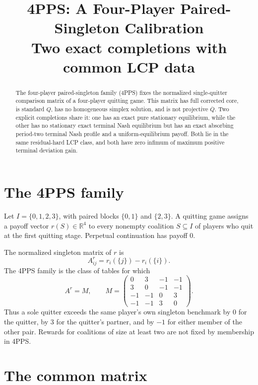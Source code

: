 \documentclass[11pt]{article}
\title{4PPS: A Four-Player Paired-Singleton Calibration\\
\large Two exact completions with common LCP data}
\author{}
\date{}
\theoremstyle{definition}
\newcommand{\R}{\mathbb R}
\begin{document}
\maketitle
\vspace{-1.5em}

\begin{abstract}
The four-player paired-singleton family (4PPS) fixes the normalized
single-quitter comparison matrix of a four-player quitting game.  This matrix
has full corrected core, is standard $Q$, has no homogeneous simplex solution,
and is not projective $\overline Q$.  Two explicit completions share it: one
has an exact pure stationary equilibrium, while the other has no stationary
exact terminal Nash equilibrium but has an exact absorbing period-two terminal
Nash profile and a uniform-equilibrium payoff.  Both lie in the same
residual-hard LCP class, and both have zero infimum of maximum positive
terminal deviation gain.
\end{abstract}

\section{The 4PPS family}

Let $I=\{0,1,2,3\}$, with paired blocks $\{0,1\}$ and $\{2,3\}$.
A quitting game assigns a payoff vector $r(S)\in\R^4$ to every nonempty
coalition $S\subseteq I$ of players who quit at the first quitting stage.
Perpetual continuation has payoff $0$.

The normalized singleton matrix of $r$ is
\begin{equation}
\label{eq:normalized-solo}
 A^r_{ij}=r_i(\{j\})-r_i(\{i\}).
\end{equation}
The 4PPS family is the class of tables for which
\begin{equation}
\label{eq:M}
 A^r=M,
 \qquad
 M=
 \begin{pmatrix}
 0&3&-1&-1\\
 3&0&-1&-1\\
 -1&-1&0&3\\
 -1&-1&3&0
 \end{pmatrix}.
\end{equation}
Thus a sole quitter exceeds the same player's own singleton benchmark by
$0$ for the quitter, by $3$ for the quitter's partner, and by $-1$ for either
member of the other pair.  Rewards for coalitions of size at least two are
not fixed by membership in 4PPS.

\section{The common matrix}
\end{document}
